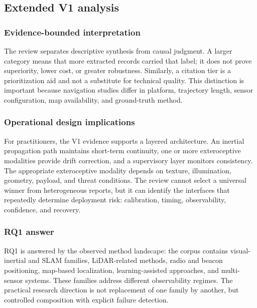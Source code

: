 \documentclass[
  journal,
  10pt]{IEEEtran}
\begin{document}
\subsection{Extended V1 analysis}\label{extended-v1-analysis}

\subsubsection{Evidence-bounded
interpretation}\label{evidence-bounded-interpretation}

The review separates descriptive synthesis from causal judgment. A
larger category means that more extracted records carried that label; it
does not prove superiority, lower cost, or greater robustness.
Similarly, a citation tier is a prioritization aid and not a substitute
for technical quality. This distinction is important because navigation
studies differ in platform, trajectory length, sensor configuration, map
availability, and ground-truth method.

\subsubsection{Operational design
implications}\label{operational-design-implications}

For practitioners, the V1 evidence supports a layered architecture. An
inertial propagation path maintains short-term continuity, one or more
exteroceptive modalities provide drift correction, and a supervisory
layer monitors consistency. The appropriate exteroceptive modality
depends on texture, illumination, geometry, payload, and threat
conditions. The review cannot select a universal winner from
heterogeneous reports, but it can identify the interfaces that
repeatedly determine deployment risk: calibration, timing,
observability, confidence, and recovery.

\subsubsection{RQ1 answer}\label{rq1-answer}

RQ1 is answered by the observed method landscape: the corpus contains
visual-inertial and SLAM families, LiDAR-related methods, radio and
beacon positioning, map-based localization, learning-assisted
approaches, and multi-sensor systems. These families address different
observability regimes. The practical research direction is not
replacement of one family by another, but controlled composition with
explicit failure detection.
\end{document}
